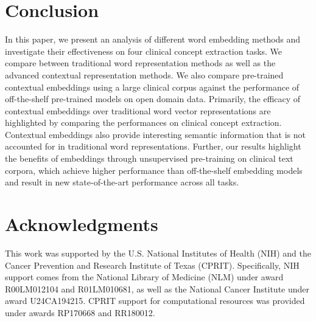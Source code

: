 \documentclass[11pt,a4paper]{article}
\begin{document}
\section{Conclusion}
In this paper, we present an analysis of different word embedding methods and investigate their effectiveness on four clinical concept extraction tasks. We compare between traditional word representation methods as well as the advanced contextual representation methods. We also compare pre-trained contextual embeddings using a large clinical corpus against the performance of off-the-shelf pre-trained models on open domain data. Primarily, the efficacy of contextual embeddings over traditional word vector representations are highlighted by comparing the performances on clinical concept extraction. Contextual embeddings also provide interesting semantic information that is not accounted for in traditional word representations. Further, our results highlight the benefits of embeddings through unsupervised pre-training on clinical text corpora, which achieve higher performance than off-the-shelf embedding models and result in new state-of-the-art performance across all tasks. 


\section*{Acknowledgments}

This work was supported by the U.S. National Institutes of Health (NIH) and the Cancer Prevention and Research Institute of Texas (CPRIT). Specifically, NIH support comes from the National Library of Medicine (NLM) under award R00LM012104 and R01LM010681, as well as the National Cancer Institute under award U24CA194215. CPRIT support for computational resources was provided under awards RP170668 and RR180012.




\end{document}
